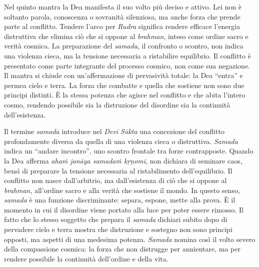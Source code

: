 Nel quinto mantra la Dea manifesta il suo volto più deciso e attivo. Lei non è soltanto parola, conoscenza o sovranità silenziosa, ma anche forza che prende parte al conflitto. Tendere l’arco per \textit{Rudra} significa rendere efficace l’energia distruttiva che elimina ciò che si oppone al \textit{brahman}, inteso come ordine sacro e verità cosmica. La preparazione del \textit{samada}, il confronto o scontro, non indica una violenza cieca, ma la tensione necessaria a ristabilire equilibrio. Il conflitto è presentato come parte integrante del processo cosmico, non come sua negazione. Il mantra si chiude con un’affermazione di pervasività totale: la Dea “entra” e permea cielo e terra. La forza che combatte e quella che sostiene non sono due principi distinti. È la stessa potenza che agisce nel conflitto e che abita l’intero cosmo, rendendo possibile sia la distruzione del disordine sia la continuità dell’esistenza.

Il termine \textit{samada} introduce nel \textit{Devī Sūkta} una concezione del conflitto profondamente diversa da quella di una violenza cieca o distruttiva. \textit{Samada} indica un “andare incontro”, uno scontro frontale tra forze contrapposte. Quando la Dea afferma \textit{ahaṁ janāya samadaṁ kṛṇomi}, non dichiara di seminare caos, bensì di preparare la tensione necessaria al ristabilimento dell’equilibrio. Il conflitto non nasce dall’arbitrio, ma dall’esistenza di ciò che si oppone al \textit{brahman}, all’ordine sacro e alla verità che sostiene il mondo. In questo senso, \textit{samada} è una funzione discriminante: separa, espone, mette alla prova. È il momento in cui il disordine viene portato alla luce per poter essere rimosso. Il fatto che lo stesso soggetto che prepara il \textit{samada} dichiari subito dopo di pervadere cielo e terra mostra che distruzione e sostegno non sono principi opposti, ma aspetti di una medesima potenza. \textit{Samada} nomina così il volto severo della compassione cosmica: la forza che non distrugge per annientare, ma per rendere possibile la continuità dell’ordine e della vita.
